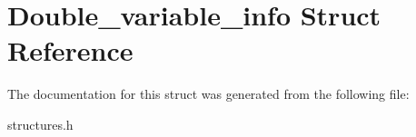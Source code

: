 \hypertarget{structDouble__variable__info}{}\section{Double\+\_\+variable\+\_\+info Struct Reference}
\label{structDouble__variable__info}


The documentation for this struct was generated from the following file\+:\begin{DoxyCompactItemize}
\item 
structures.\+h\end{DoxyCompactItemize}

